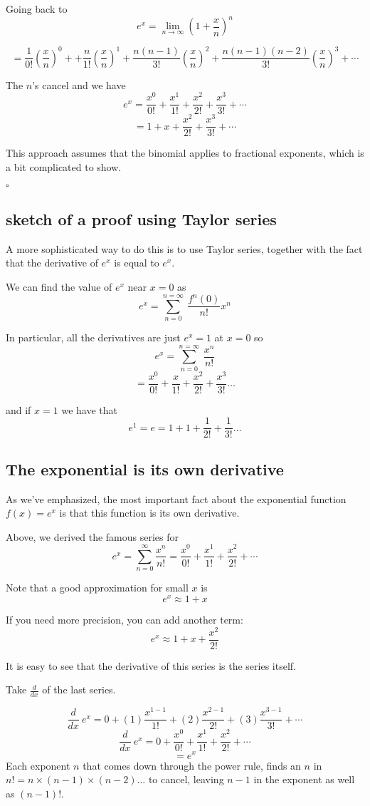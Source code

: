 \documentclass[11pt, oneside]{article}
\begin{document}
Going back to
\[ e^x = \lim_{n \to \infty} (1 + \frac{x}{n})^{n} \]

\[ = \frac{1}{0!}(\frac{x}{n})^0 + + \frac{n}{1!}({\frac{x}{n}})^1 + \frac{n(n-1)}{3!}({\frac{x}{n}})^2 + \frac{n(n-1)(n-2)}{3!}({\frac{x}{n}})^3 + \cdots  \]

The $n$'s cancel and we have
\[ e^x = \frac{x^0}{0!} + \frac{x^1}{1!} + \frac{x^2}{2!} + \frac{x^3}{3!} + \cdots \]
\[ = 1 + x + \frac{x^2}{2!} + \frac{x^3}{3!} + \cdots  \]

This approach assumes that the binomial applies to fractional exponents, which is a bit complicated to show.

$\square$

\subsection*{sketch of a proof using Taylor series}

A more sophisticated way to do this is to use Taylor series, together with the fact that the derivative of $e^x$ is equal to $e^x$.

We can find the value of $e^x$ near $x=0$ as
\[ e^x = \sum_{n=0}^{n=\infty} \ \frac{f^n(0)}{n!} x^n \]

In particular, all the derivatives are just $e^x = 1$ at $x = 0$ so
\[ e^x = \sum_{n=0}^{n=\infty} \ \frac{x^n}{n!} \]
\[ = \frac{x^0}{0!} + \frac{x}{1!} + \frac{x^2}{2!} + \frac{x^3}{3!} \dots \]

and if $x=1$ we have that
\[ e^1 = e = 1 + 1 + \frac{1}{2!} + \frac{1}{3!} \dots \]

\subsection*{The exponential is its own derivative}

As we've emphasized, the most important fact about the exponential function $f(x) = e^x$ is that this function is its own derivative.  

Above, we derived the famous series for
\[ e^x = \sum_{n=0}^{\infty} \frac{x^n}{n!} = \frac{x^{0}}{0!} + \frac{x^{1}}{1!} + \frac{x^{2}}{2!} + \cdots  \]

Note that a good approximation for small $x$ is
\[ e^x \approx 1 + x \]

If you need more precision, you can add another term:
\[ e^x \approx 1 + x + \frac{x^2}{2!} \]

It is easy to see that the derivative of this series is the series itself.

Take $\frac{d}{dx}$ of the last series.

\[ \frac{d}{dx} \ e^x = 0 + (1)\frac{x^{1-1}}{1!} + (2)\frac{x^{2-1}}{2!} + (3)\frac{x^{3-1}}{3!} + \cdots  \]
\[ \frac{d}{dx} \ e^x = 0 + \frac{x^{0}}{0!} + \frac{x^{1}}{1!} + \frac{x^{2}}{2!} + \cdots  \]
\[ = e^x \]
Each exponent $n$ that comes down through the power rule, finds an $n$ in $n!=n \times (n-1) \times (n-2) \dots $ to cancel, leaving $n-1$ in the exponent as well as $(n-1)!$.
\end{document}
